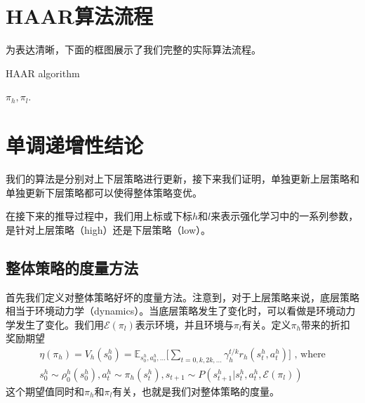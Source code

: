 \section{HAAR算法流程}
为表达清晰，下面的框图展示了我们完整的实际算法流程。
\begin{algorithm}[htbp]
  \caption{HAAR algorithm} \label{alg1}
	\begin{algorithmic}[1]
	     \ENDFOR
	    \ENDFOR
	 \ENDFOR
	  $\pi_h, \pi_l$.
\end{algorithmic}
\end{algorithm}

\section{单调递增性结论}
我们的算法是分别对上下层策略进行更新，接下来我们证明，单独更新上层策略和单独更新下层策略都可以使得整体策略变优。

在接下来的推导过程中，我们用上标或下标$h$和$l$来表示强化学习中的一系列参数，是针对上层策略（high）还是下层策略（low）。

\subsection{整体策略的度量方法}
首先我们定义对整体策略好坏的度量方法。注意到，对于上层策略来说，底层策略相当于环境动力学（dynamics）。当底层策略发生了变化时，可以看做是环境动力学发生了变化。我们用$\mathcal{E}(\pi_l)$表示环境，并且环境与$\pi_l$有关。定义$\pi_h$带来的折扣奖励期望
\begin{equation}
\begin{aligned}
  \eta(\pi_h) = V_h(s_0^h) = \mathbb{E}_{s_0^h, a_0^h, ...}\Bigg[\sum_{t = 0, k, 2k, ...} \gamma_h^{t/k} r_h(s_t^h, a_t^h)\Bigg] \text{ ,  where}   \\
  s_0^h \sim \rho_0^h(s_0^h), a_t^h \sim \pi_h(s_t^h), s_{t+1} \sim P(s_{t+1}^h|s_t^h, a_t^h, \mathcal{E}(\pi_l))
\end{aligned}
\end{equation}
这个期望值同时和$\pi_h$和$\pi_l$有关，也就是我们对整体策略的度量。

